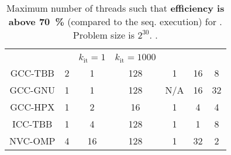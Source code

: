 \begin{table}[t]
	\caption*{Maximum number of threads such that \textbf{efficiency is above \qty{70}{\percent}} (compared to the seq. execution) for \machvsclong. Problem size is $2^{30}$. \higherisbetter.}
	\label{tab:threads-with-good-efficiency}
	\begin{adjustbox}{max width=\textwidth}
		\begin{tabular}{ccccccc}
			\toprule
			        & \groupfind & \groupforeach      & \groupforeach        & \groupinclscan & \groupreduce & \groupsort \\
			        &            & $k_\text{it} = 1 $ & $k_\text{it} = 1000$ &                &              &            \\
			\midrule
			GCC-TBB & 2          & 1                  & 128                  & 1              & 16           & 8          \\
			GCC-GNU & 1          & 1                  & 128                  & N/A            & 16           & 32         \\
			GCC-HPX & 1          & 2                  & 16                   & 1              & 4            & 4          \\
			ICC-TBB & 1          & 4                  & 128                  & 1              & 1            & 8          \\
			NVC-OMP & 4          & 16                 & 128                  & 1              & 32           & 2          \\
			\bottomrule
		\end{tabular}
	\end{adjustbox}
\end{table}